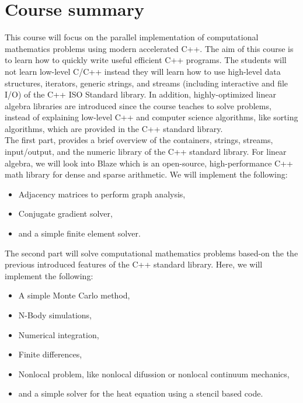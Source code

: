 \documentclass[11pt,letterpaper]{article}
\begin{document}
\section*{Course summary}
This course will focus on the parallel implementation of computational mathematics problems using modern accelerated C++. The aim of this course is to learn how to quickly write useful efficient C++ programs. The students will not learn low-level C/C++ instead they will learn how to use high-level data structures, iterators, generic strings, and streams (including interactive and file I/O) of the C++ ISO Standard library. In addition, highly-optimized linear algebra libraries are introduced since the course teaches to solve problems, instead of explaining low-level C++ and computer science algorithms, like sorting algorithms, which are provided in the C++ standard library.\\

\noindent
The first part, provides a brief overview of the containers, strings, streams, input/output, and the numeric library of the C++ standard library. For linear algebra, we will look into Blaze which is an open-source, high-performance C++ math library for dense and sparse arithmetic. We will implement the following:
\begin{itemize}
\item Adjacency matrices to perform graph analysis,
\item Conjugate gradient solver,
\item and a simple finite element solver.
\end{itemize}

The second part will solve computational mathematics problems based-on the the previous introduced features of the C++ standard library. Here, we will implement the following:
\begin{itemize}
\item A simple Monte Carlo method,
\item N-Body simulations,
\item Numerical integration,
\item Finite differences,
\item Nonlocal problem, like nonlocal difussion or nonlocal continuum mechanics,
\item and a simple solver for the heat equation using a stencil based code.
\end{itemize}
\end{document}
